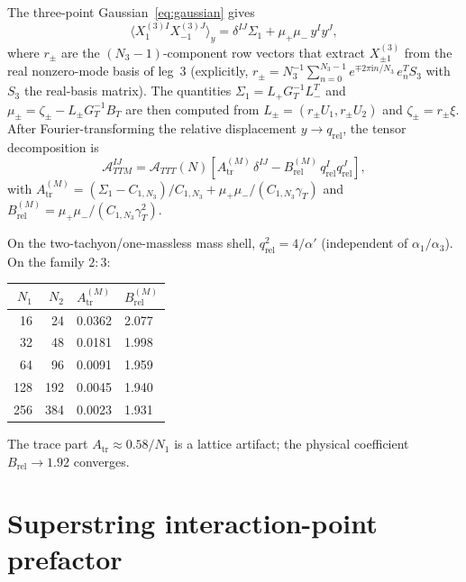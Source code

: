 \documentclass[11pt]{article}
\newcommand{\al}{\alpha'}
\newcommand{\ii}{\mathrm{i}}
\begin{document}
The three-point Gaussian~\eqref{eq:gaussian} gives
\begin{equation}
\langle X_1^{(3)I}X_{-1}^{(3)J}\rangle_y = \delta^{IJ}\Sigma_1 + \mu_+\mu_-\,y^I y^J,
\label{eq:x1x-1}
\end{equation}
where $r_\pm$ are the $(N_3 - 1)$-component row vectors that extract $X_{\pm1}^{(3)}$ from the real nonzero-mode basis of leg~3 (explicitly, $r_\pm = N_3^{-1}\sum_{n=0}^{N_3-1}e^{\mp 2\pi\ii n/N_3}\,e_n^T S_3$ with $S_3$ the real-basis matrix). The quantities $\Sigma_1 = L_+ G_T^{-1}L_-^T$ and $\mu_\pm = \zeta_\pm - L_\pm G_T^{-1}B_T$ are then computed from $L_\pm = (r_\pm U_1, r_\pm U_2)$ and $\zeta_\pm = r_\pm\xi$. After Fourier-transforming the relative displacement $y \to q_{\mathrm{rel}}$, the tensor decomposition is
\begin{equation}
\mathcal{A}_{TTM}^{IJ} = \mathcal{A}_{TTT}(N)\!\left[A_{\mathrm{tr}}^{(M)}\,\delta^{IJ} - B_{\mathrm{rel}}^{(M)}\,q_{\mathrm{rel}}^I q_{\mathrm{rel}}^J\right],
\label{eq:ttm}
\end{equation}
with $A_{\mathrm{tr}}^{(M)} = (\Sigma_1 - C_{1,N_3})/C_{1,N_3} + \mu_+\mu_-/(C_{1,N_3}\gamma_T)$ and $B_{\mathrm{rel}}^{(M)} = \mu_+\mu_-/(C_{1,N_3}\gamma_T^2)$.

On the two-tachyon/one-massless mass shell, $q_{\mathrm{rel}}^2 = 4/\al$ (independent of $\alpha_1/\alpha_3$). On the family $2:3$:

\medskip
\begin{center}
\begin{tabular}{r r l l}
\toprule
$N_1$ & $N_2$ & $A_{\mathrm{tr}}^{(M)}$ & $B_{\mathrm{rel}}^{(M)}$ \\
\midrule
16 & 24 & 0.0362 & 2.077 \\
32 & 48 & 0.0181 & 1.998 \\
64 & 96 & 0.0091 & 1.959 \\
128 & 192 & 0.0045 & 1.940 \\
256 & 384 & 0.0023 & 1.931 \\
\bottomrule
\end{tabular}
\end{center}
\medskip

The trace part $A_{\mathrm{tr}} \approx 0.58/N_1$ is a lattice artifact; the physical coefficient $B_{\mathrm{rel}} \to 1.92$ converges.

\section{Superstring interaction-point prefactor}
\label{sec:superstring}
\end{document}

